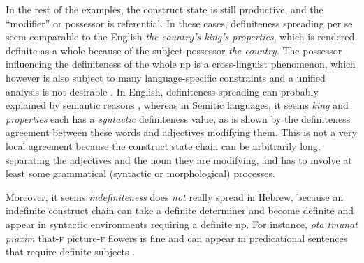 \documentclass[a4paper, oneside, 12pt]{report}
\newcommand{\form}[1]{\emph{#1}}
\newcommand{\category}[1]{\textsc{#1}}
\begin{document}
In the rest of the examples, the construct state is still productive,
and the ``modifier'' or possessor is referential.
In these cases, definiteness spreading per se seem comparable to the English \form{the country's king's properties},
which is rendered definite as a whole because of the subject-possessor \form{the country}.
The possessor influencing the definiteness of the whole \ac{np}
is a cross-linguist phenomenon,
which however is also subject to many language-specific constraints
and a unified analysis is not desirable \citep{alexiadou2005possessors}.
In English, definiteness spreading can probably explained by semantic reasons
\citep{dobrovie2000definiteness},
whereas in Semitic languages, it seems \form{king} and \form{properties} each has a \emph{syntactic} definiteness value,
as is shown by the definiteness agreement between these words and adjectives modifying them.
This is not a very local agreement because the construct state chain can be arbitrarily long,
separating the adjectives and the noun they are modifying,
and has to involve at least some grammatical (syntactic or morphological) processes.

Moreover, it seems \emph{indefiniteness} does \emph{not} really spread in Hebrew,
because an indefinite construct chain can take a definite determiner
and become definite and appear in syntactic environments requiring a definite \ac{np}.
For instance, \form{ota tmunat praxim} that-\category{f} picture-\category{f} flowers
is fine and can appear in predicational sentences that require definite subjects
\citep{alexiadou2005possessors}.
\end{document}
